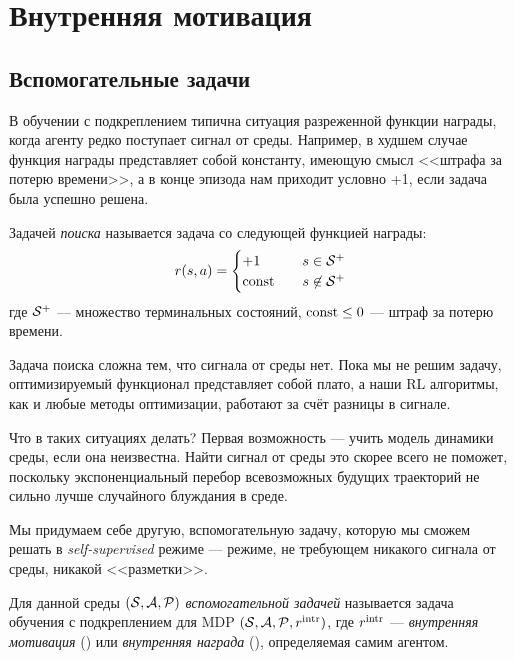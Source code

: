 \section{Внутренняя мотивация}\label{subsec:intrinsic_motivation}

\subsection{Вспомогательные задачи}

В обучении с подкреплением типична ситуация разреженной функции награды, когда агенту редко поступает сигнал от среды. Например, в худшем случае функция награды представляет собой константу, имеющую смысл <<штрафа за потерю времени>>, а в конце эпизода нам приходит условно +1, если задача была успешно решена.  

\begin{definition}
Задачей \emph{поиска} называется задача со следующей функцией награды:
\begin{equation}\label{searchreward}
r(s, a) = \begin{cases}
+1 \quad & s \in \mathcal{S}^+ \\
\operatorname{const} \quad & s \not\in \mathcal{S}^+ \\
\end{cases}    
\end{equation}
где $\mathcal{S}^+$ --- множество терминальных состояний, $\operatorname{const} \le 0$ --- штраф за потерю времени.
\end{definition}

Задача поиска сложна тем, что сигнала от среды нет. Пока мы не решим задачу, оптимизируемый функционал представляет собой плато, а наши RL алгоритмы, как и любые методы оптимизации, работают за счёт разницы в сигнале.

Что в таких ситуациях делать? Первая возможность --- учить модель динамики среды, если она неизвестна. Найти сигнал от среды это скорее всего не поможет, поскольку экспоненциальный перебор всевозможных будущих траекторий не сильно лучше случайного блуждания в среде.

Мы придумаем себе другую, вспомогательную задачу, которую мы сможем решать в \emph{self-supervised} режиме --- режиме, не требующем никакого сигнала от среды, никакой <<разметки>>.

\begin{definition}
Для данной среды $(\mathcal{S}, \mathcal{A}, \mathcal{P})$ \emph{вспомогательной задачей} называется задача обучения с подкреплением для MDP $(\mathcal{S}, \mathcal{A}, \mathcal{P}, r^{\mathrm{intr}})$, где $r^{\mathrm{intr}}$ --- \emph{внутренняя мотивация} () или \emph{внутренняя награда} (), определяемая самим агентом.
\end{definition}

